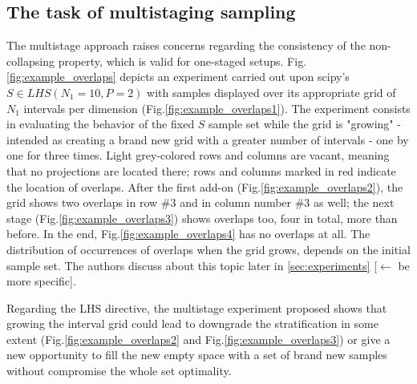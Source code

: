 \documentclass[12pt]{extarticle}
\newcommand{\mfigref}[1]{Fig.\ref{#1}}
\begin{document}
\subsection{The task of multistaging sampling}
\label{subsec:multistage_task}
The multistage approach raises concerns regarding the consistency of the non-collapsing property, which is valid for one-staged setups. \mfigref{fig:example_overlaps} depicts an experiment carried out upon scipy's $S \in LHS(N_1 = 10, P = 2)$ with samples displayed over its appropriate grid of $N_1$ intervals per dimension (\mfigref{fig:example_overlaps1}). The experiment consists in evaluating the behavior of the fixed $S$ sample set while the grid is "growing" - intended as creating a brand new grid with  a greater number of intervals - one by one for three times. 
Light grey-colored rows and columns are vacant, meaning that no projections are located there; rows and columns marked in red indicate the location of overlaps. After the first add-on (\mfigref{fig:example_overlaps2}), the grid shows two overlaps in row \#3 and in column number \#3 as well; the next stage (\mfigref{fig:example_overlaps3}) shows overlaps too, four in total, more than before. In the end, \mfigref{fig:example_overlaps4} has no overlaps at all. The distribution of occurrences of overlaps when the grid grows, depends on the initial sample set. The authors discuss about this topic later in \cref{sec:experiments} [$\longleftarrow$ be more specific].

Regarding the LHS directive, the multistage experiment proposed shows that growing the interval grid could lead to downgrade the stratification in some extent (\mfigref{fig:example_overlaps2} and \mfigref{fig:example_overlaps3}) or give a new opportunity to fill the new empty space with a set of brand new samples without compromise the whole set optimality. 
\end{document}

